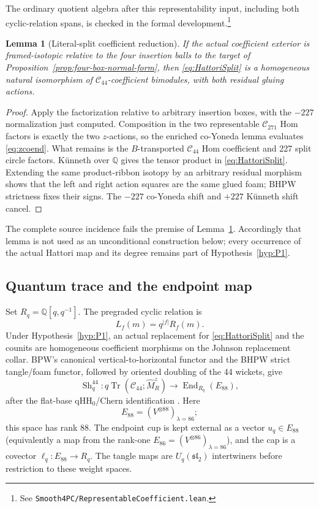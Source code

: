 \documentclass[11pt]{amsart}
\newtheorem{lemma}[theorem]{Lemma}
\theoremstyle{definition}
\theoremstyle{remark}
\newcommand{\Q}{\mathbb{Q}}
\begin{document}
The ordinary quotient algebra after this representability input, including
both cyclic-relation spans, is checked in the formal development.\footnote{See
\texttt{Smooth4PC/RepresentableCoefficient.lean}.}

\begin{lemma}[Literal-split coefficient reduction]\label{lem:C1}
If the actual coefficient exterior is framed-isotopic relative to the four
insertion balls to the target of
Proposition~\ref{prop:four-box-normal-form}, then
\eqref{eq:HattoriSplit} is a homogeneous natural isomorphism of
$\mathcal C_{44}$-coefficient bimodules, with both residual gluing actions.
\end{lemma}

\begin{proof}
Apply the factorization relative to arbitrary insertion boxes, with the
$-227$ normalization just computed.  Composition
in the two representable $\mathcal C_{271}$ Hom factors is exactly the two
$z$-actions, so the enriched co-Yoneda lemma evaluates
\eqref{eq:zcoend}.  What remains is the $B$-transported
$\mathcal C_{44}$ Hom coefficient and 227 split circle factors.  K\"unneth
over $\Q$ gives the tensor product in \eqref{eq:HattoriSplit}.  Extending the
same product-ribbon isotopy by an arbitrary residual morphism shows that the
left and right action squares are the same glued foam; BHPW strictness fixes
their signs.  The $-227$ co-Yoneda shift and $+227$ K\"unneth shift cancel.
\end{proof}

The complete source incidence fails the premise of
Lemma~\ref{lem:C1}.  Accordingly that lemma is not used as an unconditional
construction below; every occurrence of the actual Hattori map and its
degree remains part of Hypothesis~\ref{hyp:P1}.

\subsection{Quantum trace and the endpoint map}

Set $R_q=\Q[q,q^{-1}]$.  The pregraded cyclic relation is
\[
L_f(m)=q^{|f|}R_f(m).
\]
Under Hypothesis~\ref{hyp:P1}, an actual replacement for
\eqref{eq:HattoriSplit} and the counits are
homogeneous coefficient morphisms on the Johnson replacement collar.  BPW's
canonical vertical-to-horizontal functor and the BHPW strict tangle/foam
functor, followed by oriented doubling of the 44 wickets, give
\begin{equation}\label{eq:actualShadow}
\operatorname{Sh}^{44}_q:q\operatorname{Tr}(\mathcal C_{44};\widehat M_R^z)
\longrightarrow\operatorname{End}_{R_q}(E_{88}),
\end{equation}
after the flat-base qHH$_0$/Chern identification
\cite{BeliakovaPutyraWehrli2019,BeliakovaHogancampPutyraWehrli2023}.  Here
\[
E_{88}=(V^{\otimes88})_{\lambda=86};
\]
this space has rank 88.  The endpoint cup is kept external as a vector
$u_q\in E_{88}$ (equivalently a map from the rank-one
$E_{86}=(V^{\otimes86})_{\lambda=86}$), and the cap is a covector
$\ell_q:E_{88}\to R_q$.  The tangle maps are $U_q(\mathfrak{sl}_2)$
intertwiners before restriction to these weight spaces.
\end{document}

